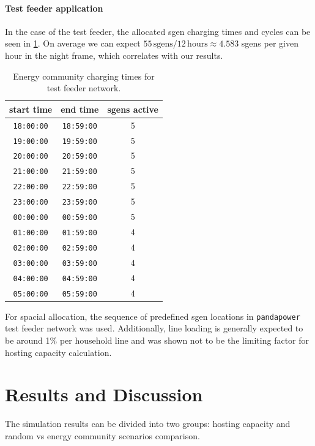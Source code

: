 \documentclass[a4paper,10pt]{report}
\begin{document}
\subsubsection{Test feeder application}
In the case of the test feeder, the allocated sgen charging times and cycles can be seen in \cref{sgen_comm_times}. On average we can expect $55\, \text{sgens} / 12\, \text{hours} \approx 4.583$ sgens per given hour in the night frame, which correlates with our results.

\begin{table}[htpb]
	\centering
	\begin{tabular}{c c c}
		\toprule
		start time & end time & sgens active \\
		\midrule
		\texttt{18:00:00} & \texttt{18:59:00} & 5\\
		\texttt{19:00:00} & \texttt{19:59:00} & 5\\
		\texttt{20:00:00} & \texttt{20:59:00} & 5\\
		\texttt{21:00:00} & \texttt{21:59:00} & 5\\
		\texttt{22:00:00} & \texttt{22:59:00} & 5\\
		\texttt{23:00:00} & \texttt{23:59:00} & 5\\
		\texttt{00:00:00} & \texttt{00:59:00} & 5\\
		\texttt{01:00:00} & \texttt{01:59:00} & 4\\
		\texttt{02:00:00} & \texttt{02:59:00} & 4\\
		\texttt{03:00:00} & \texttt{03:59:00} & 4\\
		\texttt{04:00:00} & \texttt{04:59:00} & 4\\
		\texttt{05:00:00} & \texttt{05:59:00} & 4\\
		\bottomrule
	\end{tabular}
	\caption[Energy community charging times for test feeder network]{Energy community charging times for test feeder network.}
	\label{sgen_comm_times}
\end{table}

For spacial allocation, the sequence of predefined sgen locations in \texttt{pandapower} test feeder network was used. Additionally, line loading is generally expected to be around 1\% per household line and was shown not to be the limiting factor for hosting capacity calculation.


\chapter{Results and Discussion}
The simulation results can be divided into two groups: hosting capacity and random vs energy community scenarios comparison.
\end{document}
